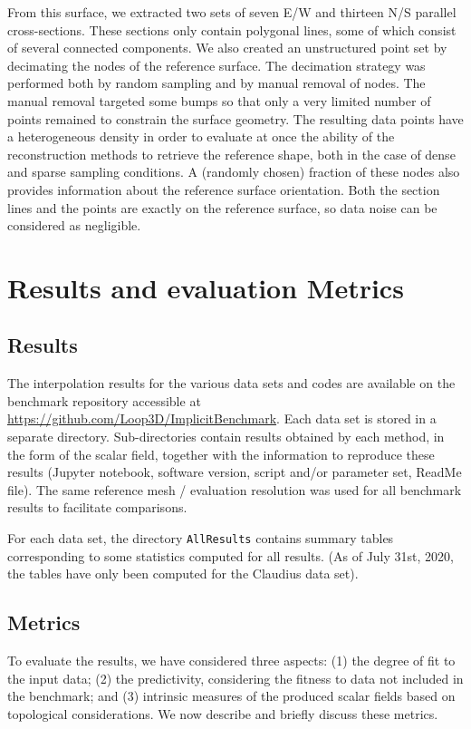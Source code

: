 \documentclass[preprint]{ring20}
\begin{document}
From this surface, we extracted two sets of seven E/W and thirteen N/S parallel cross-sections. These sections only contain polygonal lines, some of which consist of several connected components. We also created an unstructured point set by decimating the nodes of the reference surface. The decimation strategy was performed both by random sampling and by manual removal of nodes. The manual removal targeted some bumps so that only a very limited number of points remained to constrain the surface geometry. The resulting data points have a heterogeneous density in order to evaluate at once the ability of the reconstruction methods to retrieve the reference shape, both in the case of dense and sparse sampling conditions. A (randomly chosen) fraction of these nodes also provides information about the reference surface orientation. Both the section lines and the points are exactly on the reference surface, so data noise can be considered as negligible. 


\section{Results and evaluation Metrics}
\label{sec:results}

\subsection{Results}
The interpolation results for the various data sets and codes are available on the benchmark repository accessible at \url{https://github.com/Loop3D/ImplicitBenchmark}. Each data set is stored in a separate directory. Sub-directories contain results obtained by each method, in the form of the scalar field, together with the information to reproduce these results (Jupyter notebook, software version, script and/or parameter set, ReadMe file). The same reference mesh / evaluation resolution was used for all benchmark results to facilitate comparisons. 

For each data set, the directory \texttt{AllResults} contains summary tables corresponding to some statistics computed for all results. (As of July 31st, 2020, the tables have only been computed for the Claudius data set). 

\subsection{Metrics}
To evaluate the results, we have considered three aspects: (1) the degree of fit to the input data; (2) the predictivity, considering the fitness to data not included in the benchmark; and (3) intrinsic measures of the produced scalar fields based on topological considerations. We now describe and briefly discuss these metrics. 
\end{document}
